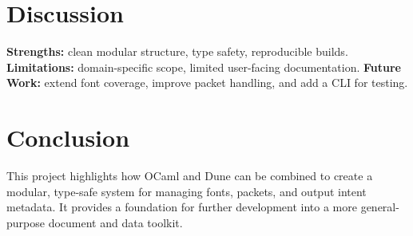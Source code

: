 \documentclass[11pt]{article}
\begin{document}
\section*{Discussion}
\textbf{Strengths:} clean modular structure, type safety, reproducible builds.  
\textbf{Limitations:} domain-specific scope, limited user-facing documentation.  
\textbf{Future Work:} extend font coverage, improve packet handling, and add a CLI for testing.

\section*{Conclusion}
This project highlights how OCaml and Dune can be combined to create a modular, type-safe system for managing fonts, packets, and output intent metadata. It provides a foundation for further development into a more general-purpose document and data toolkit.
\end{document}
